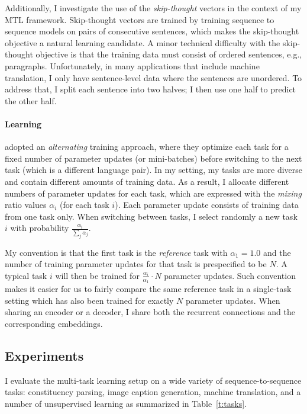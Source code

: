 Additionally, I investigate the use of the {\it skip-thought}
vectors \citep{kiros15skip} in the context of my MTL framework.
Skip-thought vectors are trained by training sequence to sequence
models on pairs of consecutive sentences, which makes the skip-thought
objective a natural \ssl{} learning candidate. A minor technical
difficulty with the skip-thought objective is that 
the training data must consist of ordered sentences, e.g., paragraphs.  Unfortunately, in
many applications that include machine translation, I only have
sentence-level data where the sentences are unordered. To
address that, I split each sentence into two halves; I then use 
one half to predict the other half.

\paragraph{Learning}
\cite{dong15} adopted an {\it alternating} training approach, where they
optimize each task for a fixed number of parameter updates (or
mini-batches) before switching to the next task (which is a different
language pair). In my setting, my tasks are more diverse and contain
different amounts of training data. As a result, I allocate different
numbers of parameter updates for each task, which are expressed with
the {\it mixing} ratio values $\alpha_i$ (for each task $i$). Each
parameter update consists of training data from one task only. When
switching between tasks, I select randomly a new task $i$ with
probability $\frac{\alpha_i}{\sum_j \alpha_j}$.


My convention is that the first task is the
{\it reference} task with $\alpha_1 = 1.0$ and the number of training
parameter updates for that task is prespecified to be $N$. A typical task $i$ will then be
trained for $\frac{\alpha_i}{\alpha_1}\cdot N$ parameter updates.
Such convention makes it easier for us to fairly compare the same reference
task in a single-task setting which has also been trained for exactly $N$
parameter updates.
When sharing an encoder or a decoder, I share both the recurrent connections
and the corresponding embeddings.

\subsection{Experiments}
\label{sec:6_1_exp}
I evaluate the multi-task learning setup on a wide variety of
sequence-to-sequence tasks: constituency parsing, image caption
generation, machine translation, and a number of unsupervised learning as
summarized in Table~\ref{t:tasks}.

